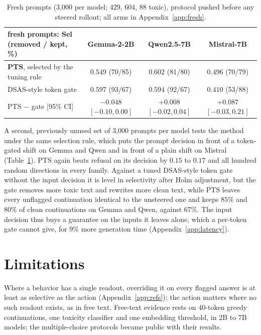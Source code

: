 \documentclass{article}
\begin{document}
\begin{table}[t]\footnotesize\setlength{\tabcolsep}{4pt}
\centering
\begin{tabular}{l|ccc}
\hline
fresh prompts: Sel (removed / kept, \%) & Gemma-2-2B & Qwen2.5-7B & Mistral-7B \\
\hline
\textbf{PTS}, selected by the tuning rule & $0.549$ (70/85) & $0.602$ (81/80) & $0.496$ (70/79) \\
DSAS-style token gate & $0.597$ (93/67) & $0.594$ (92/67) & $0.410$ (53/88) \\
PTS $-$ gate [95\% CI] & $-0.048$ {\scriptsize$[-0.10, 0.00]$} & $+0.008$ {\scriptsize$[-0.02, 0.04]$} & $+0.087$ {\scriptsize$[-0.03, 0.21]$} \\

\hline
\end{tabular}
\caption{Fresh prompts (3{,}000 per model; 429, 604, 88 toxic), protocol
pushed before any steered rollout; all arms in Appendix~\ref{app:fresh}.}
\label{tab:freshmain}
\end{table}

A second, previously unused set of 3{,}000 prompts per model tests the method
under the same selection rule, which puts the prompt decision in front of a
token-gated shift on Gemma and Qwen and in front of a plain shift on Mistral
(Table~\ref{tab:freshmain}). PTS again beats refusal on its decision by $0.15$
to $0.17$ and all hundred random directions in every family. Against a tuned
DSAS-style token gate without the input decision it is level in selectivity
after Holm adjustment, but the gate removes more toxic text and rewrites more
clean text, while PTS leaves every unflagged continuation identical to the
unsteered one and keeps $85\%$ and $80\%$ of clean continuations on Gemma and
Qwen, against $67\%$. The input decision thus buys a guarantee on the inputs
it leaves alone, which a per-token gate cannot give, for $9\%$ more generation
time (Appendix~\ref{app:latency}).



\section{Limitations}

Where a behavior has a single readout, overriding it on every flagged answer
is at least as selective as the action (Appendix~\ref{app:refs}); the action
matters where no such readout exists, as in free text. Free-text evidence
rests on 40-token greedy continuations, one toxicity classifier and one
embedding threshold, in 2B to 7B models; the multiple-choice protocols became
public with their results.
\end{document}
